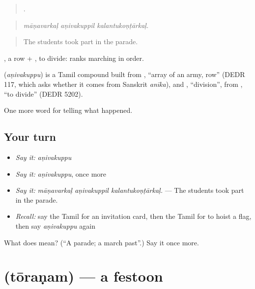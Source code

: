 \begin{quote}
  .
\end{quote}

\begin{quote}
\emph{māṇavarkaḷ aṇivakuppil kalantukoṇṭārkaḷ.}
\end{quote}

\begin{quote}
The students took part in the parade.
\end{quote}

, a row + , to divide: ranks marching in order.

\begin{cousinweb}
\textbf{} (\emph{aṇivakuppu}) is a Tamil compound built from , \textquotedblleft{}array of an army, row\textquotedblright{} (DEDR 117, which asks whether it comes from Sanskrit \emph{anīka}), and , \textquotedblleft{}division\textquotedblright{}, from , \textquotedblleft{}to divide\textquotedblright{} (DEDR 5202).
\end{cousinweb}

\begin{grammarlens}[title={What you've built}]
One more word for telling what happened.
\end{grammarlens}

\subsection*{Your turn}
\begin{itemize}
\raggedright
  \item \emph{Say it:} \emph{aṇivakuppu}
  \item \emph{Say it:} \emph{aṇivakuppu}, once more
  \item \emph{Say it:} \emph{māṇavarkaḷ aṇivakuppil kalantukoṇṭārkaḷ.} — The students took part in the parade.
  \item \emph{Recall:} say the Tamil for an invitation card, then the Tamil for to hoist a flag, then say \emph{aṇivakuppu} again
\end{itemize}

\begin{tcolorbox}[breakable,colback=teal!4,colframe=teal!35!black,title={Before you move on}]
What does  mean? (\textquotedblleft{}A parade; a march past\textquotedblright{}.) Say it once more.
\end{tcolorbox}
\section[\texorpdfstring{\ta{தோரணம்} (tōraṇam)}{தோரணம் (tōraṇam)}]{ (tōraṇam) — a festoon}

